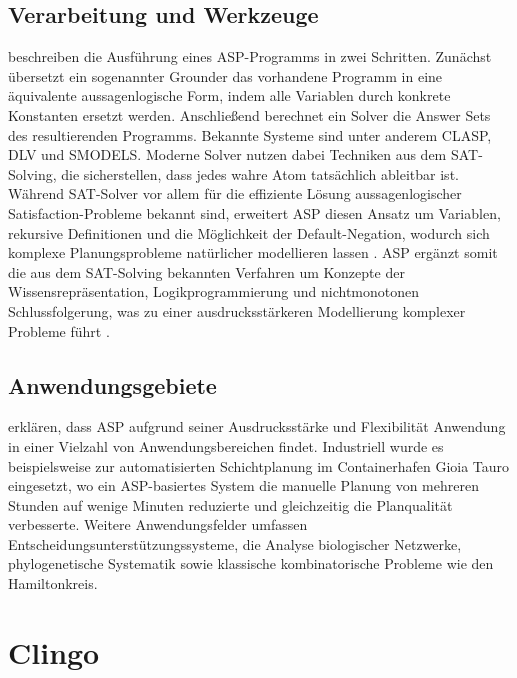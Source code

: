 \subsection{Verarbeitung und Werkzeuge}
\textcite{brewkaAnswerSetProgramming2011} beschreiben die Ausführung eines ASP-Programms in zwei Schritten. Zunächst übersetzt ein sogenannter Grounder das vorhandene Programm in eine äquivalente aussagenlogische Form, indem alle Variablen durch konkrete Konstanten ersetzt werden. Anschließend berechnet ein Solver die Answer Sets des resultierenden Programms. Bekannte Systeme sind unter anderem CLASP, DLV und SMODELS. Moderne Solver nutzen dabei Techniken aus dem SAT-Solving, die sicherstellen, dass jedes wahre Atom tatsächlich ableitbar ist. Während SAT-Solver vor allem für die effiziente Lösung aussagenlogischer Satisfaction-Probleme bekannt sind, erweitert ASP diesen Ansatz um Variablen, rekursive Definitionen und die Möglichkeit der Default-Negation, wodurch sich komplexe Planungsprobleme natürlicher modellieren lassen \parencite{drescherConstraintAnswerSet2013}. ASP ergänzt somit die aus dem SAT-Solving bekannten Verfahren um Konzepte der Wissensrepräsentation, Logikprogrammierung und nichtmonotonen Schlussfolgerung, was zu einer ausdrucksstärkeren Modellierung komplexer Probleme führt \parencite{lierlerRelatingConstraintAnswer2014}.
\subsection{Anwendungsgebiete}
\textcite{brewkaAnswerSetProgramming2011} erklären, dass ASP aufgrund seiner Ausdrucksstärke und Flexibilität Anwendung in einer Vielzahl von Anwendungsbereichen findet. Industriell wurde es beispielsweise zur automatisierten Schichtplanung im Containerhafen Gioia Tauro eingesetzt, wo ein ASP-basiertes System die manuelle Planung von mehreren Stunden auf wenige Minuten reduzierte und gleichzeitig die Planqualität verbesserte. Weitere Anwendungsfelder umfassen Entscheidungsunterstützungssysteme, die Analyse biologischer Netzwerke, phylogenetische Systematik sowie klassische kombinatorische Probleme wie den Hamiltonkreis.

\section{Clingo}

